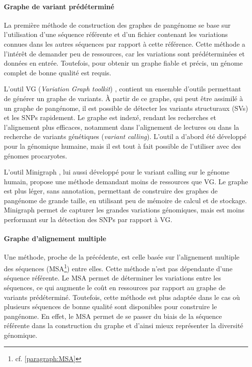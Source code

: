 \paragraph{Graphe de variant prédéterminé}

La première méthode de construction des graphes de pangénome se base sur l'utilisation d'une séquence référente et d'un fichier contenant les variations connues dans les autres séquences par rapport à cette référence. Cette méthode a l'intérêt de demander peu de ressources, car les variations sont prédéterminées et données en entrée. Toutefois, pour obtenir un graphe fiable et précis, un génome complet de bonne qualité est requis.

L'outil VG (\textit{Variation Graph toolkit}) \cite{garrison_variation_2018}, contient un ensemble d'outils permettant de générer un graphe de variants. À partir de ce graphe, qui peut être assimilé à un graphe de pangénome, il est possible de détecter les variants structuraux (SVs) et les SNPs rapidement. Le graphe est indexé, rendant les recherches et l'alignement plus efficaces, notamment dans l'alignement de lectures ou dans la recherche de variants génétiques (\textit{variant calling}). L'outil a d'abord été développé pour la génomique humaine, mais il est tout à fait possible de l'utiliser avec des génomes procaryotes.

L'outil Minigraph \cite{li_design_2020}, lui aussi développé pour le variant calling sur le génome humain, propose une méthode demandant moins de ressources que VG. Le graphe est plus léger, sans annotation, permettant de construire des graphes de pangénome de grande taille, en utilisant peu de mémoire de calcul et de stockage. Minigraph permet de capturer les grandes variations génomiques, mais est moins performant sur la détection des SNPs par rapport à VG.

\paragraph{Graphe d'alignement multiple}

Une méthode, proche de la précédente, est celle basée sur l'alignement multiple des séquences (MSA\footnote{cf. \autoref{paragraph:MSA}}) entre elles. Cette méthode n'est pas dépendante d'une séquence référente. Le MSA permet de déterminer les variations entre les séquences, ce qui augmente le coût en ressources par rapport au graphe de variants prédéterminé. Toutefois, cette méthode est plus adaptée dans le cas où plusieurs séquences de bonne qualité sont disponibles pour construire le pangénome. En effet, le MSA permet de se passer du biais de la séquence référente dans la construction du graphe et d'ainsi mieux représenter la diversité génomique.

